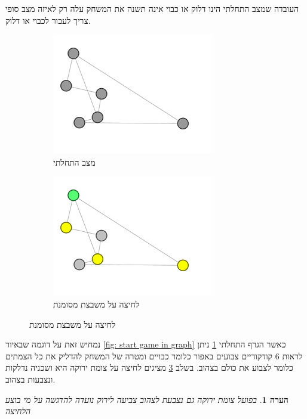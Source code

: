 \documentclass[12pt,twoside]{article}
\newtheorem{comm}{הערה}[section]
\begin{document}
העובדה שמצב התחלתי הינו דלוק או כבוי אינה תשנה את המשחק עלה רק לאיזה מצב סופי צריך לעבור
לכבוי או דלוק.

\begin{figure}[ht]
    \caption{משחק על גרף לדוגמה}
    \label{fig: start game in graph}
    \begin{subfigure}{.5\textwidth}
        \centering
        \caption{מצב התחלתי}
        \label{subfig: graph game start}
        \includegraphics[scale=0.7]{images/graph_start_board.png}
    \end{subfigure}%
    \begin{subfigure}{.5\textwidth}
        \centering
        \caption{לחיצה על משבצת מסומנת}
        \label{subfig: graph game move}
        \includegraphics[scale=0.7]{images/graph_press.png}
    \end{subfigure}%
\end{figure}

נמחיש זאת על דוגמה שבאיור
\ref{fig: start game in graph}
כאשר הגרף התחלתי
\ref{subfig: graph game start}
ניתן לראות
$6$
קודקודיים
צבועים באפור כלומר כבויים ומטרה של המשחק להדליק את כל הצמתים כלומר לצבוע את כולם בצהוב.
בשלב 
\ref{subfig: graph game move}
מציגים  לחיצה על צומת ירוקה היא ושכניה נדלקות  ונצבעות בצהוב.

\begin{comm}
    בפועל צומת ירוקה גם נצבעת לצהוב צביעה לירוק נועדה להדגשה על מי בוצע הלחיצה
\end{comm}
\end{document}

